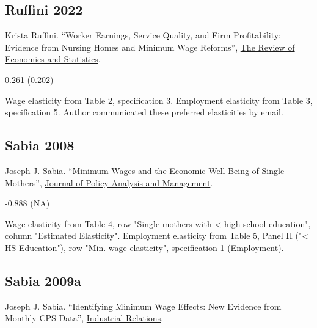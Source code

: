 \subsection*{Ruffini 2022}
\vspace{-0.7em}

\noindent Krista Ruffini. ``Worker Earnings, Service Quality, and Firm Profitability: Evidence from Nursing Homes and Minimum Wage Reforms'', \href{https://doi.org/10.1162/rest_a_01271}{The Review of Economics and Statistics}.

\vspace{0.7em}

 0.261 (0.202)

\vspace{0.7em}

 Wage elasticity from Table 2, specification 3. Employment elasticity from Table 3, specification 5. Author communicated these preferred elasticities by email.

\subsection*{Sabia 2008}
\vspace{-0.7em}

\noindent Joseph J. Sabia. ``Minimum Wages and the Economic Well-Being of Single Mothers'', \href{https://doi.org/10.1002/pam.20379}{Journal of Policy Analysis and Management}.

\vspace{0.7em}

 -0.888 (NA)

\vspace{0.7em}

 Wage elasticity from Table 4, row "Single mothers with < high school education", column "Estimated Elasticity". Employment elasticity from Table 5, Panel II ("< HS Education"), row "Min. wage elasticity", specification 1 (Employment).

\subsection*{Sabia 2009a}
\vspace{-0.7em}

\noindent Joseph J. Sabia. ``Identifying Minimum Wage Effects: New Evidence from Monthly CPS Data'', \href{https://doi.org/10.1111/j.1468-232X.2009.00559.x}{Industrial Relations}.

